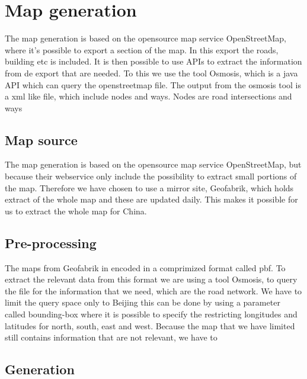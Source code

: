 \section{Map generation}
The map generation is based on the opensource map service OpenStreetMap, where it's possible to export a section of the map. In this export the roads, building etc is included. It is then possible to use APIs to extract the information from de export that are needed. To this we use the tool Osmosis, which is a java API which can query the openstreetmap file.
The output from the osmosis tool is a xml like file, which include nodes and ways. Nodes are road intersections and ways 

\subsection{Map source}
The map generation is based on the opensource map service OpenStreetMap, but because their webservice only include the possibility to extract small portions of the map.
Therefore we have chosen to use a mirror site, Geofabrik, which holds extract of the whole map and these are updated daily. This makes it possible for us to extract the whole map for China.

\subsection{Pre-processing}
The maps from Geofabrik in encoded in a comprimized format called pbf. To extract the relevant data from this format we are using a tool Osmosis, to query the file for the information that we need, which are the road network.
We have to limit the query space only to Beijing this can be done by using a parameter called bounding-box where it is possible to specify the restricting longitudes and latitudes for north, south, east and west.
Because the map that we have limited still contains information that are not relevant, we have to 

\subsection{Generation}
